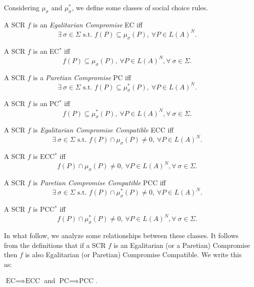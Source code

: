 \documentclass[version=3.21, pagesize, notitlepage, twoside=off, bibliography=totoc, DIV=calc, fontsize=12pt, a4paper]{scrartcl}
\newcommand{\musigma}{\mu_{\sigma}}
\newcommand{\mustar}{\mu_{\sigma}^*}
\begin{document}
Considering $\musigma$ and $\mustar$, we define some classes of social choice rules.
\begin{definition} A SCR $f$ is an \textit{Egalitarian Compromise} EC iff \[\exists \ \sigma \in \Sigma \text{ s.t. } f(P) \subseteq \musigma(P), \ \forall P \in L(A)^N.\]
\end{definition}

\begin{definition} A SCR $f$ is an EC$^*$ iff \[f(P) \subseteq \musigma(P), \ \forall P \in L(A)^N, \forall \ \sigma \in \Sigma.\]
\end{definition}

\begin{definition} A SCR $f$ is a \textit{Paretian Compromise} PC iff \[\exists \ \sigma \in \Sigma \text{ s.t. } f(P) \subseteq \mustar(P), \ \forall P \in L(A)^N.\]
\end{definition}

\begin{definition} A SCR $f$ is an PC$^*$ iff \[f(P) \subseteq \mustar(P), \ \forall P \in L(A)^N, \forall \ \sigma \in \Sigma.\]
\end{definition}

\begin{definition} A SCR $f$ is \textit{Egalitarian Compromise Compatible} ECC iff \[\exists \ \sigma \in \Sigma \text{ s.t. } f(P) \cap \musigma(P) \neq 0, \ \forall P \in L(A)^N.\]
\end{definition}

\begin{definition} A SCR $f$ is ECC$^*$ iff \[f(P) \cap \musigma(P) \neq 0, \ \forall P \in L(A)^N, \forall \ \sigma \in \Sigma.\]
\end{definition}

\begin{definition} A SCR $f$ is \textit{Paretian Compromise Compatible} PCC iff \[\exists \ \sigma \in \Sigma \text{ s.t. } f(P) \cap \mustar(P) \neq 0, \ \forall P \in L(A)^N.\]
\end{definition}

\begin{definition} A SCR $f$ is PCC$^*$ iff \[ f(P) \cap \mustar(P) \neq 0, \ \forall P \in L(A)^N, \forall \ \sigma \in \Sigma.\]
\end{definition}

In what follow, we analyze some relationships between these classes. It follows from the definitions that if a SCR $f$ is an Egalitarian (or a Paretian) Compromise then $f$ is also Egalitarian (or Paretian) Compromise Compatible. We write this as:
\begin{proposition}
	$\text{EC} \implies \text{ECC}$ and $\text{PC} \implies \text{PCC}$.
\end{proposition}
\end{document}
